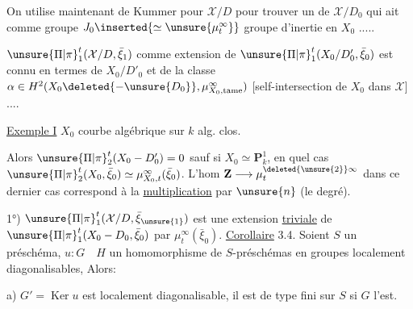On utilise maintenant  de Kummer pour $\mathcal{X}/D$ pour trouver un  de $\mathcal{X}/D_0$ qui ait comme groupe \uline{}  $J_0\inserted{\simeq\unsure{\mu_t^\infty}}$  groupe d'inertie en $X_0$ .....



$\unsure{\Pi|\pi}_1^t(\mathcal{X}/D,\bar\xi_1)$ comme extension de $\unsure{\Pi|\pi}_1^t(X_0/D'_0,\bar\xi_0)$ est connu  en termes de $X_0/D'_0$ et de la classe $\alpha\in H^2(X_0\deleted{-\unsure{D_0}},\mu_{X_0,\mathrm{tame}}^\infty)$ [self-intersection de $X_0$ dans $\mathcal{X}$] ....

\uline{Exemple I} $X_0$ courbe algébrique sur $k$ alg. clos.

Alors $\unsure{\Pi|\pi}_2^t(X_0-D'_0)=0$ sauf si $X_0\simeq\mathbf{P}^1_k$, en quel cas $\unsure{\Pi|\pi}_2^t(X_0,\bar\xi_0)\simeq\mu_{X_0,t}^{\infty}(\bar\xi_0)$. L'hom $\mathbf{Z}\longrightarrow\mu_t^{\deleted{\unsure{2}}\infty}$ dans ce dernier cas correspond  à la \uline{multiplication} par $\unsure{n}$ (le degré). 

1°)  $\unsure{\Pi|\pi}_1^t(\mathcal{X}/D,\bar\xi_{\unsure{1}})$ est une extension \uline{triviale} de $\unsure{\Pi|\pi}_1^t(X_0-D_0,\bar\xi_0)$ par $\mu_t^\infty(\bar\xi_0)$.
\uline{Corollaire} 3.4. Soient $S$ un préschéma, $u:G\quad H$ un homomorphisme de  $S$-préschémas en groupes localement diagonalisables, Alors:

a) $G'=\operatorname{Ker}u$ est localement diagonalisable, il est de type fini sur $S$ si $G$ l'est.

